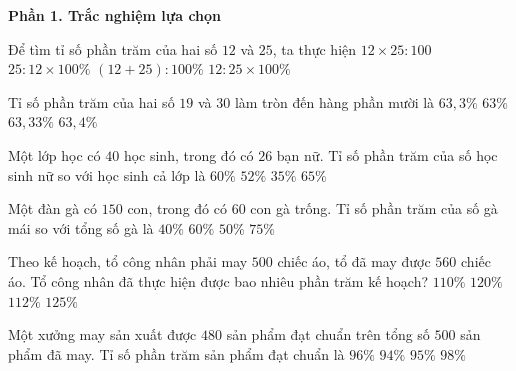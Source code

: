 \textbf{Phần 1. Trắc nghiệm lựa chọn}

\begin{ex} %
Để tìm tỉ số phần trăm của hai số $12$ và $25$, ta thực hiện
\choice
{$12 \times 25 : 100$}
{$25 : 12 \times 100\%$}
{$(12 + 25) : 100\%$}
{\True $12 : 25 \times 100\%$}
\end{ex}

\begin{ex} %
Tỉ số phần trăm của hai số $19$ và $30$ làm tròn đến hàng phần mười là
\choice
{\True $63{,}3\%$}
{$63\%$}
{$63{,}33\%$}
{$63{,}4\%$}
\end{ex}

\begin{ex} %
Một lớp học có $40$ học sinh, trong đó có $26$ bạn nữ. Tỉ số phần trăm của số học sinh nữ so với học sinh cả lớp là
\choice
{$60\%$}
{$52\%$}
{$35\%$}
{\True $65\%$}
\end{ex}

\begin{ex} %
Một đàn gà có $150$ con, trong đó có $60$ con gà trống. Tỉ số phần trăm của số gà mái so với tổng số gà là
\choice
{$40\%$}
{\True $60\%$}
{$50\%$}
{$75\%$}
\end{ex}

\begin{ex} %
Theo kế hoạch, tổ công nhân phải may $500$ chiếc áo, tổ đã may được $560$ chiếc áo. Tổ công nhân đã thực hiện được bao nhiêu phần trăm kế hoạch?
\choice
{$110\%$}
{$120\%$}
{\True $112\%$}
{$125\%$}
\end{ex}

\begin{ex} %
Một xưởng may sản xuất được $480$ sản phẩm đạt chuẩn trên tổng số $500$ sản phẩm đã may. Tỉ số phần trăm sản phẩm đạt chuẩn là
\choice
{\True $96\%$}
{$94\%$}
{$95\%$}
{$98\%$}
\end{ex}

